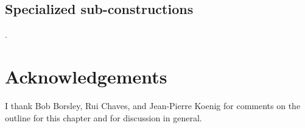 \documentclass[output=paper]{langsci/langscibook}
\begin{document}
\citet{Jacobs2008a}

\citet[Section~21.10.1]{MuellerGT-Eng1}


\subsection{Specialized sub-constructions}

.

\section*{Acknowledgements}

I thank Bob Borsley, Rui Chaves, and Jean-Pierre Koenig for comments on the outline for this chapter and for discussion in general.

{\sloppy
\printbibliography[heading=subbibliography,notkeyword=this] 
}
\end{document}
